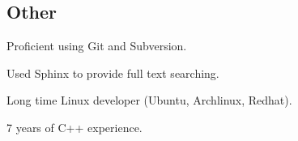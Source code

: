 \documentclass{resume}
\begin{document}
\subsection{Other}
\begin{compactitem}
  \item Proficient using Git and Subversion.
  \item Used Sphinx to provide full text searching.
  \item Long time Linux developer (Ubuntu, Archlinux, Redhat).
  \item 7 years of C++ experience.
\end{compactitem}
\end{document}
